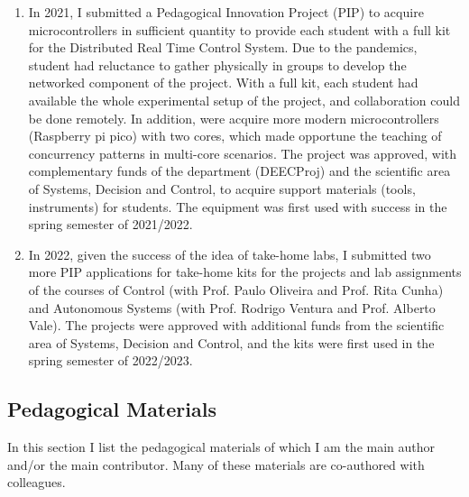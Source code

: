\begin{enumerate}
  widely used in industry, the introduction of these modules improves
  the practical relevance of the course project.
\item
  In 2021, I submitted a Pedagogical Innovation Project (PIP) to acquire
  microcontrollers in sufficient quantity to provide each student with a
  full kit for the Distributed Real Time Control System. Due to the
  pandemics, student had reluctance to gather physically in groups to
  develop the networked component of the project. With a full kit, each
  student had available the whole experimental setup of the project, and
  collaboration could be done remotely. In addition, were acquire more
  modern microcontrollers (Raspberry pi pico) with two cores, which made
  opportune the teaching of concurrency patterns in multi-core
  scenarios. The project was approved, with complementary funds of the
  department (DEECProj) and the scientific area of Systems, Decision and
  Control, to acquire support materials (tools, instruments) for
  students. The equipment was first used with success in the spring
  semester of 2021/2022.
\item
  In 2022, given the success of the idea of take-home labs, I submitted
  two more PIP applications for take-home kits for the projects and lab
  assignments of the courses of Control (with Prof. Paulo Oliveira and
  Prof. Rita Cunha) and Autonomous Systems (with Prof. Rodrigo Ventura
  and Prof. Alberto Vale). The projects were approved with additional
  funds from the scientific area of Systems, Decision and Control, and
  the kits were first used in the spring semester of 2022/2023.
\end{enumerate}

\subsection{Pedagogical Materials}\label{pedagogical-materials}

In this section I list the pedagogical materials of which I am the main
author and/or the main contributor. Many of these materials are
co-authored with colleagues.

